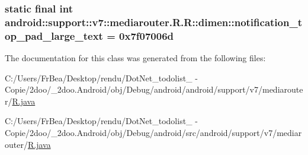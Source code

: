 \hypertarget{classandroid_1_1support_1_1v7_1_1mediarouter_1_1_r_1_1dimen_9a8b348ae1b400123aa9c4f0252a1c7a}{
\subsubsection[{notification\_\-top\_\-pad\_\-large\_\-text}]{\setlength{\rightskip}{0pt plus 5cm}static final int android::support::v7::mediarouter.R.R::dimen::notification\_\-top\_\-pad\_\-large\_\-text = 0x7f07006d}}
\label{classandroid_1_1support_1_1v7_1_1mediarouter_1_1_r_1_1dimen_9a8b348ae1b400123aa9c4f0252a1c7a}




The documentation for this class was generated from the following files:\begin{CompactItemize}
\item 
C:/Users/FrBea/Desktop/rendu/DotNet\_\-todolist\_ - Copie/2doo/\_\-2doo.Android/obj/Debug/android/android/support/v7/mediarouter/\hyperlink{android_2support_2v7_2mediarouter_2_r_8java}{R.java}\item 
C:/Users/FrBea/Desktop/rendu/DotNet\_\-todolist\_ - Copie/2doo/\_\-2doo.Android/obj/Debug/android/src/android/support/v7/mediarouter/\hyperlink{src_2android_2support_2v7_2mediarouter_2_r_8java}{R.java}\end{CompactItemize}
